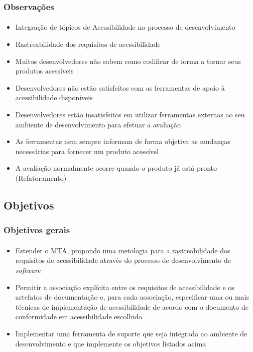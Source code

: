 \documentclass{beamer}
\begin{document}
\begin{frame}[allowframebreaks]
\frametitle{Observações}
\framesubtitle{}

\begin{itemize}
  \item Integração de tópicos de Acessibilidade no processo de desenvolvimento \citep{springerlink:10.1007/978-3-642-02713-0,maia:10}
  \item Rastreabilidade dos requisitos de acessibilidade
  \item Muitos desenvolvedores não sabem como codificar de forma a tornar seus produtos acessíveis \citep{1630123,alves:11}
  \item Desenvolvedores não estão satisfeitos com as ferramentas de apoio à acessibilidade disponíveis \citep{Trewin:2010:ACT:1805986.1806029}
  \item Desenvolvedores estão insatisfeitos em utilizar ferramentas externas ao
seu ambiente de desenvolvimento para efetuar a avaliação \citep{Trewin:2010:ACT:1805986.1806029}
  \item As ferramentas nem sempre informam de forma objetiva as mudanças necessárias para fornecer um produto acessível \citep{groves:12}
  \item A avaliação normalmente ocorre quando o produto já está pronto (Refatoramento)  
\end{itemize}

\end{frame}

\subsection[Objetivos]{Objetivos}

\begin{frame}
\frametitle{Objetivos gerais}
\framesubtitle{}

\begin{itemize}
 \item Estender o MTA, propondo uma metologia para a rastreabilidade dos requisitos de acessibilidade através do processo de desenvolvimento de \textit{software}
 \item Permitir a associação explícita entre os requisitos de acessibilidade e os artefatos de documentação e, para cada associação, especificar uma ou mais técnicas de implementação de acessibilidade de acordo com o documento de conformidade em acessibilidade escolhido
 \item Implementar uma ferramenta de suporte que seja integrada ao ambiente de desenvolvimento e que implemente os objetivos listados acima
\end{itemize}

\end{frame}
\end{document}
